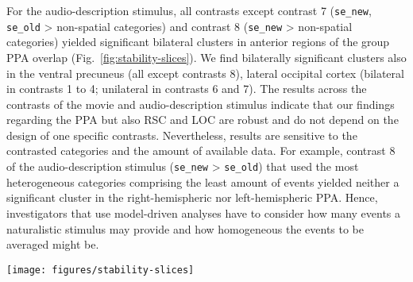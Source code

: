 \documentclass[english]{article}
\begin{document}
For the audio-description stimulus, all contrasts except contrast 7
(\texttt{se\_new}, \texttt{se\_old} > non-spatial categories) and contrast 8
(\texttt{se\_new} > non-spatial categories) yielded significant bilateral
clusters in anterior regions of the group PPA overlap
(Fig.~\ref{fig:stability-slices}).
We find bilaterally significant clusters also in the ventral precuneus (all
except contrasts 8), lateral occipital cortex (bilateral in contrasts 1 to 4;
unilateral in contrasts 6 and 7).
The results across the contrasts of the movie and audio-description stimulus
indicate that our findings regarding the PPA but also RSC and LOC are robust and
do not depend on the design of one specific contrasts.
Nevertheless, results are sensitive to the contrasted categories and the amount
of available data.
For example, contrast 8 of the audio-description stimulus (\texttt{se\_new} > \texttt{se\_old})
that used the most heterogeneous categories comprising the least amount of
events yielded neither a significant cluster in the right-hemispheric nor
left-hemispheric PPA.
Hence, investigators that use model-driven analyses have to consider how many
events a naturalistic stimulus may provide and how homogeneous the events to be
averaged might be.



\begin{figure*}[tbp]
\centering
    \texttt{[image: figures/stability-slices]}
    \caption{Overlap of significant clusters ($Z$>3.4; $p$<.05, cluster corrected)
        The audio-description's contrasts 1-8 (blue; \ref{tab:ao-contrasts})
        are overlaid over the audio-visual movie's contrasts 1-5 (red;
        \ref{tab:av-contrasts}).
        Cluster are overlaid on top of the MNI152 T1-weighted head template
        with the acquisition field-of-view for the audio-description study
        highlighted.
        Black: outline of overlapping individual PPA ROIs.
        The figure shows that some contrasts yielded significant clusters
        also in the lateral temporal and prefrontal cortex.
        }
    \label{fig:stability-slices}
\end{figure*}


\begin{comment}
    the mother of total confusion: Aminoff shifts the PPA along the
    anterior-poster axis depending on publication;
    in Aminoff (2007, 2013):
    anterior PPA = spatial associations,
    region anterior to (!) PPA = non-spatial associations;
    in Aminoff (2015):
    posterior PPA = spatial associations,
    anterior PPA = non-spatial associations;
    hence: complete bullshit;
    ignore Aminoff (2015) due to various reasons
\end{comment}
\end{document}
